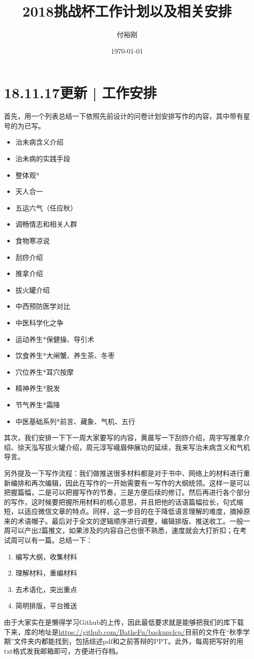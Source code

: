 \documentclass{article}
\title{2018挑战杯工作计划以及相关安排}
\author{付裕刚}
\date{\today}
\begin{document}
    \maketitle
    \section{18.11.17更新 | 工作安排}
    首先，用一个列表总结一下依照先前设计的问卷计划安排写作的内容，其中带有星号的为已写。
    \begin{itemize}
        \item 治未病含义介绍
        \item 治未病的实践手段
        \item 整体观*
        \item 天人合一
        \item 五运六气（任应秋）
        \item 调畅情志和相关人群
        \item 食物寒凉说
        \item 刮痧介绍
        \item 推拿介绍
        \item 拔火罐介绍
        \item 中西预防医学对比
        \item 中医科学化之争
        \item 运动养生*保健操、导引术
        \item 饮食养生*大闸蟹、养生茶、冬枣
        \item 穴位养生*耳穴按摩
        \item 精神养生*脱发
        \item 节气养生*霜降
        \item 中医基础系列*前言、藏象、气机、五行
    \end{itemize}

其次，我们安排一下下一周大家要写的内容，黄晨写一下刮痧介绍，周宇写推拿介绍、徐天泓写拔火罐介绍，周元淳写峨眉伸展功的延续，我来写治未病含义和气机导言。

另外提及一下写作流程：我们做推送很多材料都是对于书中、网络上的材料进行重新编排和再次编辑，因此在写作的一开始需要有一写作的大纲统领。这样一是可以把握篇幅，二是可以把握写作的节奏，三是方便后续的修订。然后再进行各个部分的写作，这时候要把握所用材料的核心意思，并且把他的话语篇幅拉长，句式缩短，以适应微信文章的特点。同样，这一步目的在于降低语言理解的难度，摘掉原来的术语帽子。最后对于全文的逻辑顺序进行调整，编辑排版、推送收工。一般一周可以产出2篇推文，如果涉及的内容自己也很不熟悉，速度就会大打折扣；在考试周可以有一篇。总结一下：
\begin{enumerate}
    \item 编写大纲，收集材料
    \item 理解材料，重编材料
    \item 去术语化，突出重点
    \item 简明排版，平台推送
\end{enumerate}
由于大家实在是懒得学习Github的上传，因此最低要求就是能够把我们的库下载下来，库的地址是\url{https://github.com/BatheFu/backupclcp/}目前的文件在“秋季学期”文件夹内都能找到，包括综述pdf和之前答辩的PPT。此外，每周把写好的用txt格式发我邮箱即可，方便进行存档。
\end{document}
